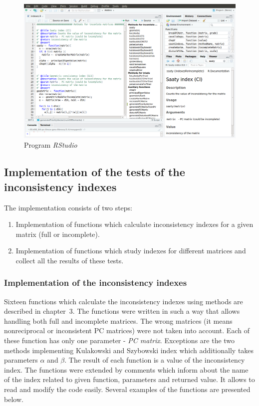 \begin{figure}[!]
\centerline{\includegraphics[width=\textwidth]{images/rstudio.png}}
\caption{Program \textit{RStudio}}
\label{fig:rstudio}
\end{figure}

\subsection{Implementation of the tests of the inconsistency indexes}
The implementation consists of two steps:
\begin{enumerate}
  \item Implementation of functions which calculate inconsistency indexes for a given matrix (full or incomplete).
  \item Implementation of functions which study indexes for different matrices and collect all the results of these tests. 
\end{enumerate}

\subsubsection{Implementation of the inconsistency indexes}
Sixteen functions which calculate the inconsistency indexes using methods are described in chapter~3. The functions were written in such a way that allows handling both full and incomplete matrices. The wrong matrices (it means nonreciprocal or inconsistent PC matrices) were not taken into account. Each of these function has only one parameter - \textit{PC matrix}. Exceptions are the two methods implementing Kulakowski and Szybowski index which additionally takes parameters $\alpha$ and $\beta$. The result of each function is a value of the inconsistency index. The functions were extended by comments which inform about the name of the index related to given function, parameters and returned value. It allows to read and modify the code easily. Several examples of the functions are presented below.

